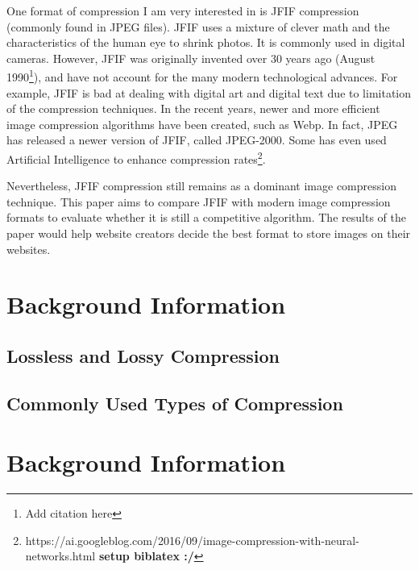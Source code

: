 \documentclass{article}
\begin{document}
One format of compression I am very interested in is JFIF compression (commonly found in JPEG files).
JFIF uses a mixture of clever math and the characteristics of the human eye to shrink photos.
It is commonly used in digital cameras.
However, JFIF was originally invented over 30 years ago (August 1990\footnote{Add citation here}), and have not account for the many modern technological advances.
For example, JFIF is bad at dealing with digital art and digital text due to limitation of the compression techniques.
In the recent years, newer and more efficient image compression algorithms have been created, such as Webp. 
In fact, JPEG has released a newer version of JFIF, called JPEG-2000.
Some has even used Artificial Intelligence to enhance compression rates\footnote{https://ai.googleblog.com/2016/09/image-compression-with-neural-networks.html \textbf{setup biblatex :/}}.

Nevertheless, JFIF compression still remains as a dominant image compression technique.
This paper aims to compare JFIF with modern image compression formats to evaluate whether it is still a competitive algorithm.
The results of the paper would help website creators decide the best format to store images on their websites.

\section{Background Information}

\subsection{Lossless and Lossy Compression}

\subsection{Commonly Used Types of Compression}

\section{Background Information}
\end{document}
